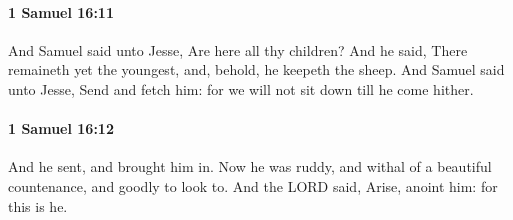 		\paragraph{1 Samuel 16:11} %
			\label{1SAMUEL-16-11}

			And Samuel said unto Jesse, Are here all thy children? And he said, There remaineth yet the youngest, and, behold, he keepeth the sheep. And Samuel said unto Jesse, Send and fetch him: for we will not sit down till he come hither.


		\paragraph{1 Samuel 16:12} %
			\label{1SAMUEL-16-12}

			And he sent, and brought him in. Now he was ruddy, and withal of a beautiful countenance, and goodly to look to. And the LORD said, Arise, anoint him: for this is he.

